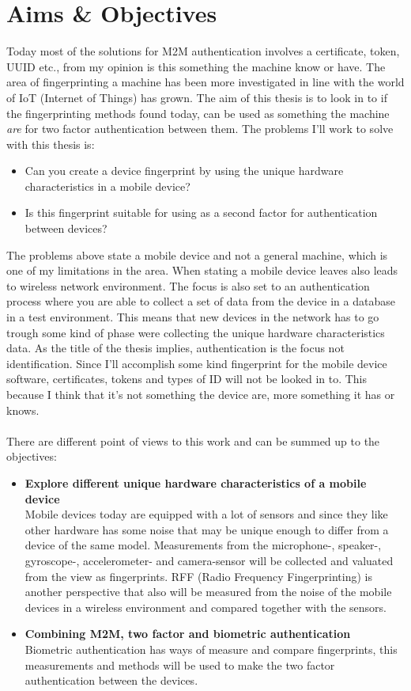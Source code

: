 \section{Aims \& Objectives}\label{sec:aim}
Today most of the solutions for M2M authentication involves a certificate, token, UUID etc., from my opinion is this something the machine know or have. The area of fingerprinting a machine has been more investigated in line with the world of IoT (Internet of Things) has grown. The aim of this thesis is to look in to if the fingerprinting methods found today, can be used as something the machine \textit{are} for two factor authentication between them. The problems I'll work to solve with this thesis is:
\begin{itemize}
	\item[] Can you create a device fingerprint by using the unique hardware characteristics in a mobile device?
	\item[] Is this fingerprint suitable for using as a second factor for authentication between devices?
\end{itemize}
The problems above state a mobile device and not a general machine, which is one of my limitations in the area. When stating a mobile device leaves also leads to wireless network environment. The focus is also set to an authentication process where you are able to collect a set of data from the device in a database in a test environment. This means that new devices in the network has to go trough some kind of phase were collecting the unique hardware characteristics data. As the title of the thesis implies, authentication is the focus not identification. Since I'll accomplish some kind fingerprint for the mobile device software, certificates, tokens and types of ID will not be looked in to. This because I think that it's not something the device are, more something it has or knows. \\
\\
There are different point of views to this work and can be summed up to the objectives:
\begin{itemize}
	\item[] \textbf{Explore different unique hardware characteristics of a mobile device} \\
	Mobile devices today are equipped with a lot of sensors and since they like other hardware has some noise that may be unique enough to differ from a device of the same model. Measurements from the microphone-, speaker-, gyroscope-, accelerometer- and camera-sensor will be collected and valuated from the view as fingerprints. RFF (Radio Frequency Fingerprinting) is another perspective that also will be measured from the noise of the mobile devices in a wireless environment and compared together with the sensors.
	\item[] \textbf{Combining M2M, two factor and biometric authentication} \\
	Biometric authentication has ways of measure and compare fingerprints, this measurements and methods will be used to make the two factor authentication between the devices.
\end{itemize}

